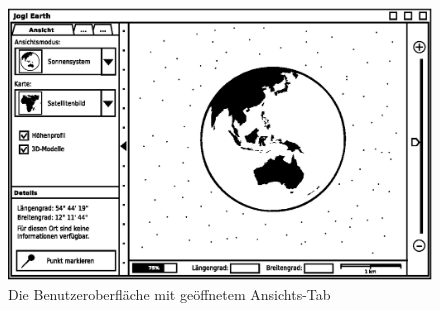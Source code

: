 \documentclass[10pt]{scrreprt}
\begin{document}
\begin{figure}
	\centering
	\includegraphics[scale=0.9]{GUI-Ansicht.eps}
	\caption{Die Benutzeroberfläche mit geöffnetem Ansichts-Tab}
\end{figure}
\end{document}
